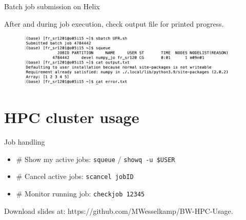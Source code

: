 \documentclass{beamer}
\begin{document}
\begin{frame}{Batch job submission on Helix}

After and during job execution, check output file for printed progress. 

\begin{figure}
    \centering
    \includegraphics[width=1\linewidth]{examples/ScreenShots/S3.png}
\end{figure}

\end{frame}

\section{HPC cluster usage}

\begin{frame}{Job handling}

\begin{itemize}
    \item # Show my active jobs: \texttt{squeue} / \texttt{showq -u \$USER}
    \item # Cancel active jobs: \texttt{scancel jobID}
    \item # Monitor running job: \texttt{checkjob 12345}
\end{itemize}

\vspace{2cm}

Download slides at: https://github.com/MWesselkamp/BW-HPC-Usage.

\end{frame}
\end{document}

